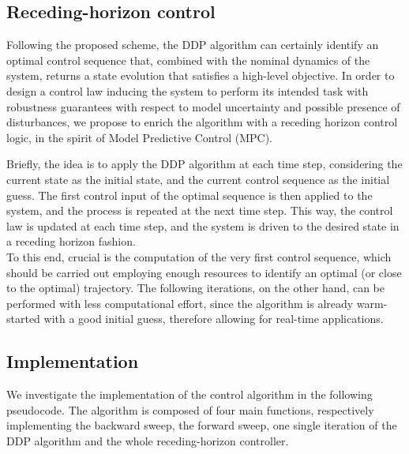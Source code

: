 \subsection{Receding-horizon control}
Following the proposed scheme, the DDP algorithm can certainly identify an optimal control sequence that, combined with the nominal dynamics of the system, returns a state evolution that satisfies a high-level objective. In order to design a control law inducing the system to perform its intended task with robustness guarantees with respect to model uncertainty and possible presence of disturbances, we propose to enrich the algorithm with a receding horizon control logic, in the spirit of Model Predictive Control (MPC).

Briefly, the idea is to apply the DDP algorithm at each time step, considering the current state as the initial state, and the current control sequence as the initial guess. The first control input of the optimal sequence is then applied to the system, and the process is repeated at the next time step. This way, the control law is updated at each time step, and the system is driven to the desired state in a receding horizon fashion.\\
To this end, crucial is the computation of the very first control sequence, which should be carried out employing enough resources to identify an optimal (or close to the optimal) trajectory. The following iterations, on the other hand, can be performed with less computational effort, since the algorithm is already warm-started with a good initial guess, therefore allowing for real-time applications.

\subsection{Implementation}
We investigate the implementation of the control algorithm in the following pseudocode. The algorithm is composed of four main functions, respectively implementing the backward sweep, the forward sweep, one single iteration of the DDP algorithm and the whole receding-horizon controller. 


